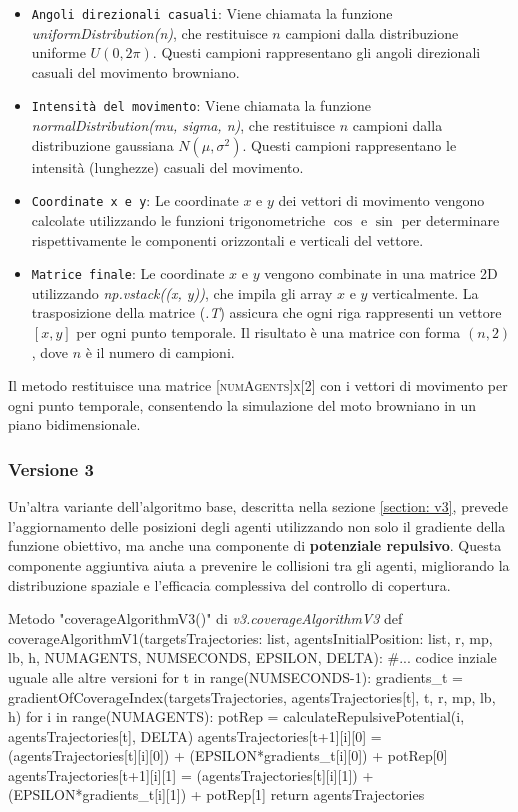\documentclass[twoside]{article}
\begin{document}
\begin{itemize}
    \item \verb|Angoli direzionali casuali|: Viene chiamata la funzione \textit{uniformDistribution(n)}, che restituisce $n$ campioni dalla distribuzione uniforme $U(0, 2\pi)$. Questi campioni rappresentano gli angoli direzionali casuali del movimento browniano.
    \item \verb|Intensità del movimento|: Viene chiamata la funzione \textit{normalDistribution(mu, sigma, n)}, che restituisce $n$ campioni dalla distribuzione gaussiana $N(\mu, \sigma^2)$. Questi campioni rappresentano le intensità (lunghezze) casuali del movimento.
    \item \verb|Coordinate x e y|: Le coordinate $x$ e $y$ dei vettori di movimento vengono calcolate utilizzando le funzioni trigonometriche $\cos$ e $\sin$ per determinare rispettivamente le componenti orizzontali e verticali del vettore.
    \item \verb|Matrice finale|: Le coordinate $x$ e $y$ vengono combinate in una matrice 2D utilizzando \textit{np.vstack((x, y))}, che impila gli array $x$ e $y$ verticalmente. La trasposizione della matrice (\textit{.T}) assicura che ogni riga rappresenti un vettore $[x, y]$ per ogni punto temporale. Il risultato è una matrice con forma $(n, 2)$, dove $n$ è il numero di campioni.
\end{itemize}

Il metodo restituisce una matrice \textsc{[numAgents]x[2]} con i vettori di movimento per ogni punto temporale, consentendo la simulazione del moto browniano in un piano bidimensionale.


\subsubsection{Versione 3}

Un'altra variante dell'algoritmo base, descritta nella sezione \ref{section: v3}, prevede l'aggiornamento delle posizioni degli agenti utilizzando non solo il gradiente della funzione obiettivo, ma anche una componente di \textbf{potenziale repulsivo}. Questa componente aggiuntiva aiuta a prevenire le collisioni tra gli agenti, migliorando la distribuzione spaziale e l'efficacia complessiva del controllo di copertura.

\begin{code}{Metodo "coverageAlgorithmV3()" di \textit{v3.coverageAlgorithmV3}}
def coverageAlgorithmV1(targetsTrajectories: list, agentsInitialPosition: list, r, mp, lb, h, NUMAGENTS, NUMSECONDS, EPSILON, DELTA):
    #... codice inziale uguale alle altre versioni
    for t in range(NUMSECONDS-1): 
        gradients_t = gradientOfCoverageIndex(targetsTrajectories, agentsTrajectories[t], t, r, mp, lb, h)
        for i in range(NUMAGENTS):
            potRep = calculateRepulsivePotential(i, agentsTrajectories[t], DELTA)
            agentsTrajectories[t+1][i][0] = (agentsTrajectories[t][i][0]) + (EPSILON*gradients_t[i][0]) + potRep[0]
            agentsTrajectories[t+1][i][1] = (agentsTrajectories[t][i][1]) + (EPSILON*gradients_t[i][1]) + potRep[1]
    return agentsTrajectories
\end{code}
\end{document}
